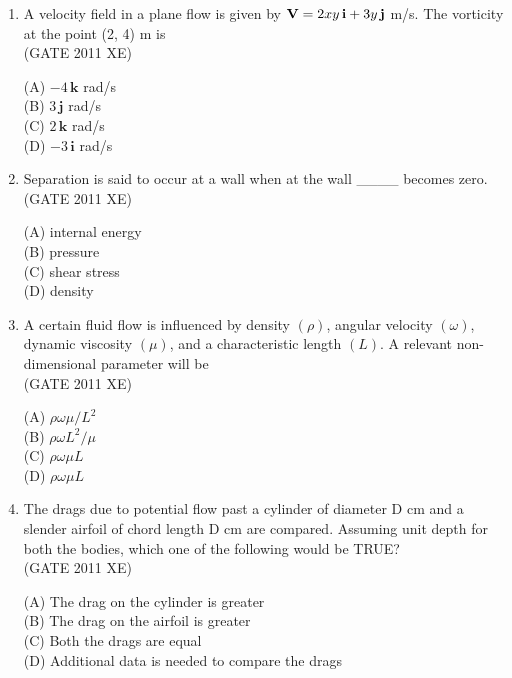 \documentclass[journal,12pt,onecolumn]{IEEEtran}
\begin{document}
\begin{enumerate}
\item A velocity field in a plane flow is given by ${\bf V} = 2 x y\, \mathbf{i} + 3 y\, \mathbf{j}$ m/s. The vorticity at the point (2, 4) m is\\

\hfill{(GATE 2011 XE)} \\
\begin{multicols}{4}
(A) $-4\, \mathbf{k}$ rad/s\\
(B) $3\, \mathbf{j}$ rad/s\\
(C) $2\, \mathbf{k}$ rad/s\\
(D) $-3\, \mathbf{i}$ rad/s
\end{multicols}

\item Separation is said to occur at a wall when at the wall \_\_\_\_ becomes zero.\\

\hfill{(GATE 2011 XE)} \\
\begin{multicols}{4}
(A) internal energy\\
(B) pressure\\
(C) shear stress\\
(D) density
\end{multicols}

\newpage

\item A certain fluid flow is influenced by density $(\rho)$, angular velocity $(\omega)$, dynamic viscosity $(\mu)$, and a characteristic length $(L)$. A relevant non-dimensional parameter will be\\
\hfill{(GATE 2011 XE)} \\
\begin{multicols}{4}
(A) $\rho \omega \mu / L^2$\\
(B) $\rho \omega L^2 / \mu$\\
(C) $\rho \omega \mu L$\\
(D) $\rho \omega \mu L$
\end{multicols}

\item The drags due to potential flow past a cylinder of diameter D cm and a slender airfoil of chord length D cm are compared. Assuming unit depth for both the bodies, which one of the following would be TRUE?\\
\hfill{(GATE 2011 XE)} \\
\begin{multicols}{2}
(A) The drag on the cylinder is greater\\
(B) The drag on the airfoil is greater\\
(C) Both the drags are equal\\
(D) Additional data is needed to compare the drags
\end{multicols}


\end{enumerate}
\end{document}

